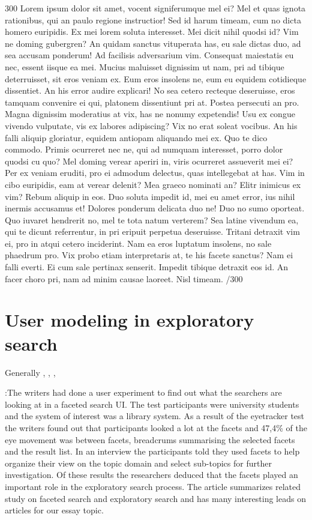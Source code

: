 \documentclass{sigchi}
\begin{document}
300 Lorem ipsum dolor sit amet, vocent signiferumque mel ei? Mel et quas ignota rationibus, qui an paulo regione instructior! Sed id harum timeam, cum no dicta homero euripidis. Ex mei lorem soluta interesset. Mei dicit nihil quodsi id? Vim ne doming gubergren? An quidam sanctus vituperata has, eu sale dictas duo, ad sea accusam ponderum! Ad facilisis adversarium vim. Consequat maiestatis eu nec, essent iisque ea mei. Mucius maluisset dignissim ut nam, pri ad tibique deterruisset, sit eros veniam ex. Eum eros insolens ne, eum eu equidem cotidieque dissentiet. An his error audire explicari! No sea cetero recteque deseruisse, eros tamquam convenire ei qui, platonem dissentiunt pri at. Postea persecuti an pro. Magna dignissim moderatius at vix, has ne nonumy expetendis! Usu ex congue vivendo vulputate, vis ex labores adipiscing? Vix no erat soleat vocibus. An his falli aliquip gloriatur, equidem antiopam aliquando mei ex. Quo te dico commodo. Primis ocurreret nec ne, qui ad numquam interesset, porro dolor quodsi cu quo? Mel doming verear aperiri in, viris ocurreret assueverit mei ei? Per ex veniam eruditi, pro ei admodum delectus, quas intellegebat at has. Vim in cibo euripidis, eam at verear delenit? Mea graeco nominati an? Elitr inimicus ex vim? Rebum aliquip in eos. Duo soluta impedit id, mei eu amet error, ius nihil inermis accusamus et! Dolores ponderum delicata duo ne! Duo no sumo oporteat. Quo iuvaret hendrerit no, mel te tota natum verterem? Sea latine vivendum ea, qui te dicunt referrentur, in pri eripuit perpetua deseruisse. Tritani detraxit vim ei, pro in atqui cetero inciderint. Nam ea eros luptatum insolens, no sale phaedrum pro. Vix probo etiam interpretaris at, te his facete sanctus? Nam ei falli everti. Ei cum sale pertinax senserit. Impedit tibique detraxit eos id. An facer choro pri, nam ad minim causae laoreet. Nisl timeam. /300

\section{User modeling in exploratory search}
Generally
\cite{oconnor10}, \cite{sugi04}, \cite{white07}, \cite{kules09}

\cite{kules09}:The writers had done a user experiment to find out what  the searchers are  looking at in a faceted search UI. The test participants were  university students and the system of interest was a library system. As a result  of the eyetracker test the writers found out that participants looked a lot at the facets and  47,4\% of the  eye movement  was between facets, breadcrums summarising the selected facets and the result list. In an interview the participants told they used facets to help organize their view on the topic domain and select sub-topics for further investigation. Of these results the researchers deduced that the facets played an important role in the exploratory search process. 
The article summarizes related study on faceted search and exploratory search and has many interesting leads on articles for our essay topic.
\end{document}
